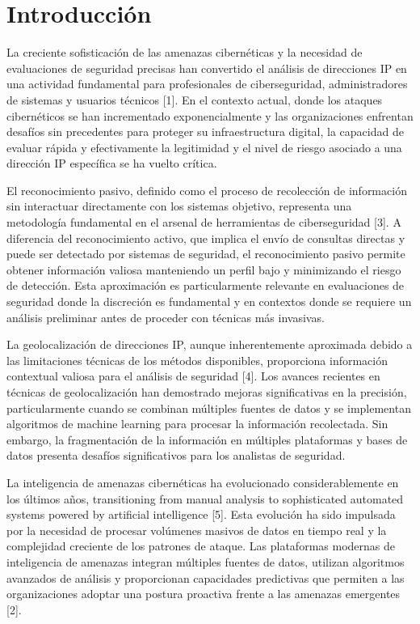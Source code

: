 \section{Introducción}
La creciente sofisticación de las amenazas cibernéticas y la necesidad de evaluaciones de seguridad precisas han convertido el análisis de direcciones IP en una actividad fundamental para profesionales de ciberseguridad, administradores de sistemas y usuarios técnicos [1]. En el contexto actual, donde los ataques cibernéticos se han incrementado exponencialmente y las organizaciones enfrentan desafíos sin precedentes para proteger su infraestructura digital, la capacidad de evaluar rápida y efectivamente la legitimidad y el nivel de riesgo asociado a una dirección IP específica se ha vuelto crítica.

El reconocimiento pasivo, definido como el proceso de recolección de información sin interactuar directamente con los sistemas objetivo, representa una metodología fundamental en el arsenal de herramientas de ciberseguridad [3]. A diferencia del reconocimiento activo, que implica el envío de consultas directas y puede ser detectado por sistemas de seguridad, el reconocimiento pasivo permite obtener información valiosa manteniendo un perfil bajo y minimizando el riesgo de detección. Esta aproximación es particularmente relevante en evaluaciones de seguridad donde la discreción es fundamental y en contextos donde se requiere un análisis preliminar antes de proceder con técnicas más invasivas.

La geolocalización de direcciones IP, aunque inherentemente aproximada debido a las limitaciones técnicas de los métodos disponibles, proporciona información contextual valiosa para el análisis de seguridad [4]. Los avances recientes en técnicas de geolocalización han demostrado mejoras significativas en la precisión, particularmente cuando se combinan múltiples fuentes de datos y se implementan algoritmos de machine learning para procesar la información recolectada. Sin embargo, la fragmentación de la información en múltiples plataformas y bases de datos presenta desafíos significativos para los analistas de seguridad.

La inteligencia de amenazas cibernéticas ha evolucionado considerablemente en los últimos años, transitioning from manual analysis to sophisticated automated systems powered by artificial intelligence [5]. Esta evolución ha sido impulsada por la necesidad de procesar volúmenes masivos de datos en tiempo real y la complejidad creciente de los patrones de ataque. Las plataformas modernas de inteligencia de amenazas integran múltiples fuentes de datos, utilizan algoritmos avanzados de análisis y proporcionan capacidades predictivas que permiten a las organizaciones adoptar una postura proactiva frente a las amenazas emergentes [2].

